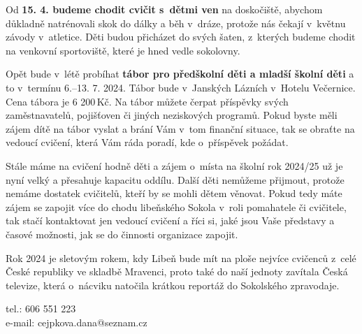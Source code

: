 \documentclass[11pt]{article}
\begin{document}
Od \textbf{15. 4. budeme chodit cvičit s~dětmi ven} na doskočiště, abychom důkladně natrénovali skok do dálky a běh v~dráze, protože nás čekají v~květnu závody v~atletice. Děti budou přicházet do svých šaten, z~kterých budeme chodit na venkovní sportoviště, které je hned vedle sokolovny.

Opět bude v~létě probíhat \textbf{tábor pro předškolní děti a mladší školní děti} a to v~termínu 6.–13. 7. 2024. Tábor bude v~Janských Lázních v~Hotelu Večernice. Cena tábora je 6 200\,Kč. Na tábor můžete čerpat příspěvky svých zaměstnavatelů, pojišťoven či jiných neziskových programů. Pokud byste měli zájem dítě na tábor vyslat a brání Vám v~tom finanční situace, tak se obraťte na vedoucí cvičení, která Vám ráda poradí, kde o~příspěvek požádat.

Stále máme na cvičení hodně děti a zájem o~místa na školní rok 2024/25 už je nyní velký a přesahuje kapacitu oddílu. Další děti nemůžeme přijmout, protože nemáme dostatek cvičitelů, kteří by se mohli dětem věnovat. Pokud tedy máte zájem se zapojit více do chodu libeňského Sokola v~roli pomahatele či cvičitele, tak stačí kontaktovat jen vedoucí cvičení a říci si, jaké jsou Vaše představy a časové možnosti, jak se do činnosti organizace zapojit.

Rok 2024 je sletovým rokem, kdy Libeň bude mít na ploše nejvíce cvičenců z~celé České republiky ve skladbě Mravenci, proto také do naší jednoty zavítala Česká televize, která o~nácviku natočila krátkou reportáž do Sokolského zpravodaje.

\signature{Dana Cejpková}{tel.: 606 551 223\\e-mail: cejpkova.dana@seznam.cz}

\vspace*{24pt}

\clearpage
\end{document}
